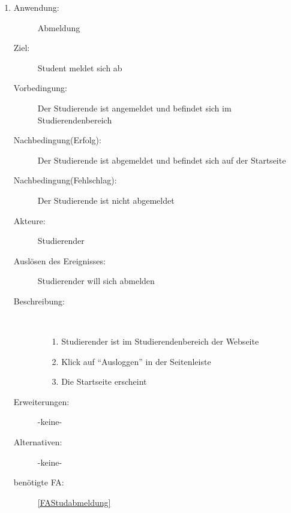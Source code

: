 \documentclass[parskip=full]{scrartcl}
\newcommand{\swtLabel}[1]{\textbf{/#1\arabic*0/}}
\begin{document}
\begin{enumerate}[label=\swtLabel{S}]
  \item \label{UCstudLogout}
    \begin{description}
  	\item[Anwendung:] Abmeldung
  	\item[Ziel:] Student meldet sich ab
  	\item[Vorbedingung:] Der Studierende ist angemeldet und befindet sich im Studierendenbereich
  	\item[Nachbedingung(Erfolg):] Der Studierende ist abgemeldet und befindet sich auf der Startseite
  	\item[Nachbedingung(Fehlschlag):] Der Studierende ist nicht abgemeldet
  	\item[Akteure:] Studierender
  	\item[Auslösen des Ereignisses:] Studierender will sich abmelden
  	\item[Beschreibung:]~
  	\begin{enumerate}
  	  \item[1.] Studierender ist im Studierendenbereich der Webseite
      \item[2.] Klick auf \enquote{Ausloggen} in der Seitenleiste
      \item[3.] Die Startseite erscheint
  	\end{enumerate}
  	\item[Erweiterungen:] -keine-
  	\item[Alternativen:] -keine-
  	\item[benötigte FA:] \ref{FAStudabmeldung}
  \end{description}
   
\end{enumerate}
\end{document}
